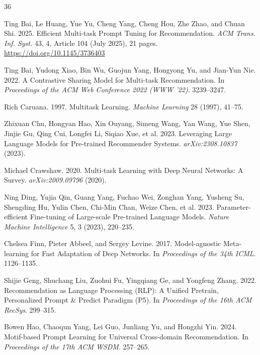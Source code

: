 \documentclass[review,anonymous]{acmart}
\begin{document}
\begin{thebibliography}{36}

Ting Bai, Le Huang, Yue Yu, Cheng Yang, Cheng Hou, Zhe Zhao, and Chuan Shi.
2025. Efficient Multi-task Prompt Tuning for Recommendation.
\emph{ACM Trans. Inf. Syst.} 43, 4, Article 104 (July 2025), 21 pages.
\url{https://doi.org/10.1145/3736403}

Ting Bai, Yudong Xiao, Bin Wu, Guojun Yang, Hongyong Yu, and Jian-Yun Nie.
2022. A Contrastive Sharing Model for Multi-task Recommendation.
In \emph{Proceedings of the ACM Web Conference 2022 (WWW '22)}. 3239--3247.

Rich Caruana. 1997. Multitask Learning.
\emph{Machine Learning} 28 (1997), 41--75.

Zhixuan Chu, Hongyan Hao, Xin Ouyang, Simeng Wang, Yan Wang, Yue Shen, Jinjie Gu,
Qing Cui, Longfei Li, Siqiao Xue, et al. 2023. Leveraging Large Language Models
for Pre-trained Recommender Systems. \emph{arXiv:2308.10837} (2023).

Michael Crawshaw. 2020. Multi-task Learning with Deep Neural Networks: A Survey.
\emph{arXiv:2009.09796} (2020).

Ning Ding, Yujia Qin, Guang Yang, Fuchao Wei, Zonghan Yang, Yusheng Su,
Shengding Hu, Yulin Chen, Chi-Min Chan, Weize Chen, et al. 2023.
Parameter-efficient Fine-tuning of Large-scale Pre-trained Language Models.
\emph{Nature Machine Intelligence} 5, 3 (2023), 220--235.

Chelsea Finn, Pieter Abbeel, and Sergey Levine. 2017. Model-agnostic
Meta-learning for Fast Adaptation of Deep Networks.
In \emph{Proceedings of the 34th ICML}. 1126--1135.

Shijie Geng, Shuchang Liu, Zuohui Fu, Yingqiang Ge, and Yongfeng Zhang. 2022.
Recommendation as Language Processing (RLP): A Unified Pretrain, Personalized
Prompt \& Predict Paradigm (P5).
In \emph{Proceedings of the 16th ACM RecSys}. 299--315.

Bowen Hao, Chaoqun Yang, Lei Guo, Junliang Yu, and Hongzhi Yin. 2024.
Motif-based Prompt Learning for Universal Cross-domain Recommendation.
In \emph{Proceedings of the 17th ACM WSDM}. 257--265.


\end{thebibliography}
\end{document}
